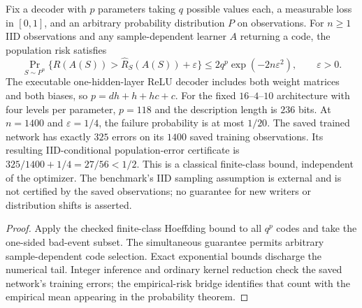 \begin{lemma}\label{lem:quantized_mlp_certificate}
\leanok
{}
Fix a decoder with $p$ parameters taking $q$ possible values each, a measurable
loss in $[0,1]$, and an arbitrary probability distribution $P$ on observations.
For $n\ge1$ IID observations and any sample-dependent learner $A$ returning a
code, the population risk satisfies
\[
 \Pr_{S\sim P^n}\{R(A(S))>\widehat R_S(A(S))+\varepsilon\}
 \le 2q^p\exp(-2n\varepsilon^2),\qquad \varepsilon>0.
\]
The executable one-hidden-layer ReLU decoder includes both weight matrices and
both biases, so $p=dh+h+hc+c$. For the fixed $16$--$4$--$10$ architecture with
four levels per parameter, $p=118$ and the description length is $236$ bits.
At $n=1400$ and $\varepsilon=1/4$, the failure probability is at most $1/20$.
The saved trained network has exactly $325$ errors on its $1400$ saved training
observations. Its resulting IID-conditional population-error certificate is
$325/1400+1/4=27/56<1/2$.
This is a classical finite-class bound, independent of the optimizer. The
benchmark's IID sampling assumption is external and is not certified by the
saved observations; no guarantee for new writers or distribution shifts is
asserted.
\end{lemma}
\begin{proof}
\leanok
Apply the checked finite-class Hoeffding bound to all $q^p$ codes and take the
one-sided bad-event subset. The simultaneous guarantee permits arbitrary
sample-dependent code selection. Exact exponential bounds discharge the
numerical tail. Integer inference and ordinary kernel reduction check the
saved network's training errors; the empirical-risk bridge identifies that
count with the empirical mean appearing in the probability theorem.
\end{proof}

